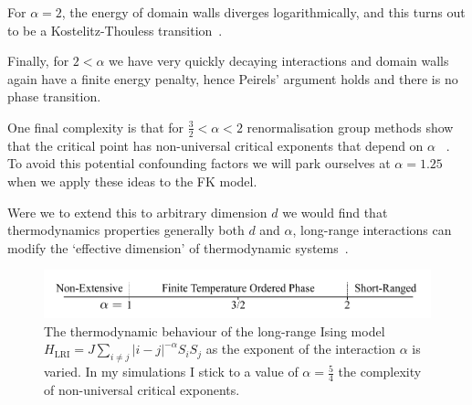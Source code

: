 For \(\alpha = 2\), the energy of domain walls diverges logarithmically, and this turns out to be a Kostelitz-Thouless transition~\autocite{thoulessLongRangeOrderOneDimensional1969}.

Finally, for \(2 < \alpha\) we have very quickly decaying interactions and domain walls again have a finite energy penalty, hence Peirels' argument holds and there is no phase transition.

One final complexity is that for \(\tfrac{3}{2} < \alpha < 2\) renormalisation group methods show that the critical point has non-universal critical exponents that depend on \(\alpha\) ~\autocite{fisherCriticalExponentsLongRange1972}. To avoid this potential confounding factors we will park ourselves at \(\alpha = 1.25\) when we apply these ideas to the FK model.

Were we to extend this to arbitrary dimension \(d\) we would find that thermodynamics properties generally both \(d\) and \(\alpha\), long-range interactions can modify the `effective dimension' of thermodynamic systems~\autocite{angeliniRelationsShortrangeLongrange2014}.

\hypertarget{fig:alpha_diagram}{%
\begin{figure}
\centering
\includegraphics[width=1\textwidth,height=\textheight]{figure_code/background_chapter/alpha_diagram}
\caption[{Long-Range Ising Model Behaviour}]{The thermodynamic behaviour of the long-range Ising model \(H_{\mathrm{LRI}} = J \sum_{i\neq j} |i - j|^{-\alpha} S_i S_j\) as the exponent of the interaction \(\alpha\) is varied. In my simulations I stick to a value of \(\alpha = \tfrac{5}{4}\) the complexity of non-universal critical exponents.}
\label{fig:alpha_diagram}
\end{figure}
}
